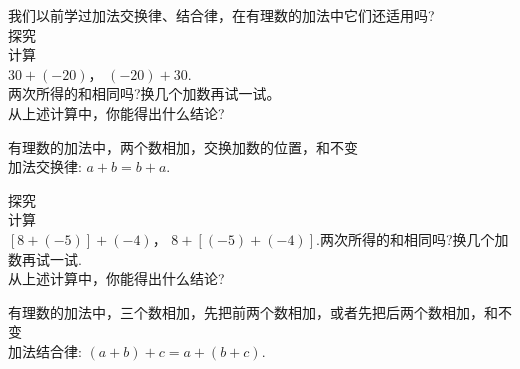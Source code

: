 \documentclass{article}
\begin{document}
    我们以前学过加法交换律、结合律，在有理数的加法中它们还适用吗?\\
    
    探究\\
    
    计算\\
    
    $30+(-20)$， $(-20)+30$.\\
    
    两次所得的和相同吗?换几个加数再试一试。\\
    
    
    从上述计算中，你能得出什么结论? \\
    
\begin{property}
    
有理数的加法中，两个数相加，交换加数的位置，和不变\\

加法交换律: $a+b=b+a$.\\

\end{property}
    
    探究\\
    
    计算\\

$[8+(-5)]+(-4)$， $8+[(-5)+(-4)]$.两次所得的和相同吗?换几个加数再试一试.\\

从上述计算中，你能得出什么结论? \\

\begin{property}
    
有理数的加法中，三个数相加，先把前两个数相加，或者先把后两个数相加，和不变\\
加法结合律: $(a+b)+c=a+(b+c)$.\\

\end{property}
\end{document}
